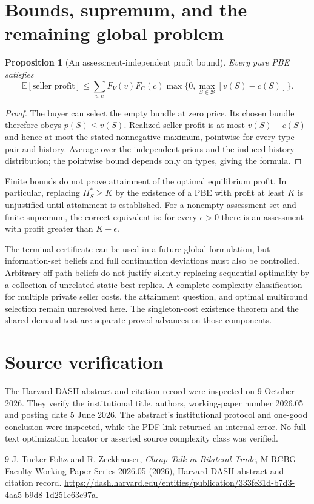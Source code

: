 \documentclass[11pt]{article}
\newtheorem{proposition}[theorem]{Proposition}
\theoremstyle{remark}
\newcommand{\E}{\mathbb E}
\begin{document}
\section{Bounds, supremum, and the remaining global problem}
\begin{proposition}[An assessment-independent profit bound]
Every pure PBE satisfies
\[
 \E[\text{seller profit}]
 \leq\sum_{v,c}F_V(v)F_C(c)
 \max\{0,\max_{S\in\mathcal B}[v(S)-c(S)]\}.
\]
\end{proposition}
\begin{proof}
The buyer can select the empty bundle at zero price. Its chosen bundle therefore obeys $p(S)\leq v(S)$. Realized seller profit is at most $v(S)-c(S)$ and hence at most the stated nonnegative maximum, pointwise for every type pair and history. Average over the independent priors and the induced history distribution; the pointwise bound depends only on types, giving the formula.
\end{proof}

Finite bounds do not prove attainment of the optimal equilibrium profit. In particular, replacing $\Pi_S^*\geq K$ by the existence of a PBE with profit at least $K$ is unjustified until attainment is established. For a nonempty assessment set and finite supremum, the correct equivalent is: for every $\epsilon>0$ there is an assessment with profit greater than $K-\epsilon$.

The terminal certificate can be used in a future global formulation, but information-set beliefs and full continuation deviations must also be controlled. Arbitrary off-path beliefs do not justify silently replacing sequential optimality by a collection of unrelated static best replies. A complete complexity classification for multiple private seller costs, the attainment question, and optimal multiround selection remain unresolved here. The singleton-cost existence theorem and the shared-demand test are separate proved advances on those components.

\section{Source verification}
The Harvard DASH abstract and citation record were inspected on 9 October 2026. They verify the institutional title, authors, working-paper number 2026.05 and posting date 5 June 2026. The abstract's institutional protocol and one-good conclusion were inspected, while the PDF link returned an internal error. No full-text optimization locator or asserted source complexity class was verified.

\begin{thebibliography}{9}
 J. Tucker-Foltz and R. Zeckhauser, \emph{Cheap Talk in Bilateral Trade}, M-RCBG Faculty Working Paper Series 2026.05 (2026), Harvard DASH abstract and citation record. \url{https://dash.harvard.edu/entities/publication/333fe31d-b7d3-4aa5-b9d8-1d251e63c97a}.
\end{thebibliography}
\end{document}
